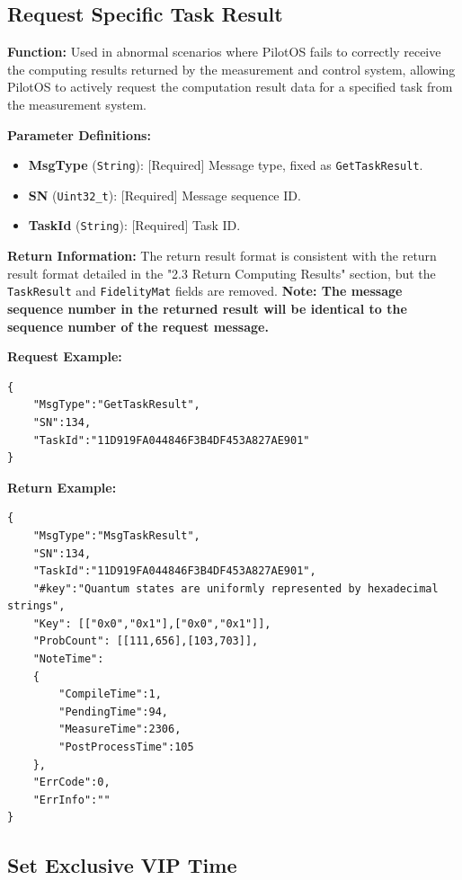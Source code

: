 \documentclass[12pt, a4paper]{article}
\begin{document}
\subsection{Request Specific Task Result}

\textbf{Function:} Used in abnormal scenarios where PilotOS fails to correctly receive the computing results returned by the measurement and control system, allowing PilotOS to actively request the computation result data for a specified task from the measurement system.

\textbf{Parameter Definitions:}
\begin{itemize}
    \item \textbf{MsgType} (\texttt{String}): [Required] Message type, fixed as \texttt{GetTaskResult}.
    \item \textbf{SN} (\texttt{Uint32\_t}): [Required] Message sequence ID.
    \item \textbf{TaskId} (\texttt{String}): [Required] Task ID.
\end{itemize}

\textbf{Return Information:}
The return result format is consistent with the return result format detailed in the "2.3 Return Computing Results" section, but the \texttt{TaskResult} and \texttt{FidelityMat} fields are removed. 
\textbf{Note: The message sequence number in the returned result will be identical to the sequence number of the request message.}

\noindent \textbf{Request Example:}
\begin{lstlisting}
{
    "MsgType":"GetTaskResult",
    "SN":134,
    "TaskId":"11D919FA044846F3B4DF453A827AE901"
}
\end{lstlisting}

\noindent \textbf{Return Example:}
\begin{lstlisting}
{
    "MsgType":"MsgTaskResult",
    "SN":134,
    "TaskId":"11D919FA044846F3B4DF453A827AE901",
    "#key":"Quantum states are uniformly represented by hexadecimal strings",
    "Key": [["0x0","0x1"],["0x0","0x1"]],
    "ProbCount": [[111,656],[103,703]],
    "NoteTime":
    {
        "CompileTime":1,
        "PendingTime":94,
        "MeasureTime":2306,
        "PostProcessTime":105
    },
    "ErrCode":0,
    "ErrInfo":""
}
\end{lstlisting}

\subsection{Set Exclusive VIP Time}
\end{document}
